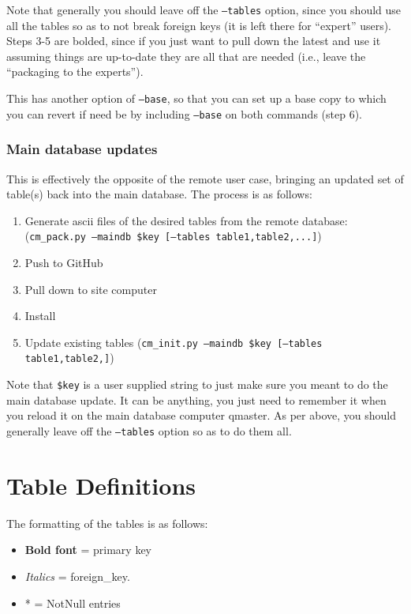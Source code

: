 \documentclass{article}
\begin{document}
Note that generally you should leave off the {\tt --tables} option, since you should use all the tables so as to not break foreign keys (it is left there for ``expert'' users).  Steps 3-5 are bolded, since if you just want to pull down the latest and use it assuming things are up-to-date they are all that are needed (i.e., leave the ``packaging to the experts'').

This has another option of {\tt --base}, so that you can set up a base copy to which you can revert if need be by including {\tt --base} on both commands (step 6).
	
\subsubsection{Main database updates}
This is effectively the opposite of the remote user case, bringing an updated set of table(s) back into the main database.  The process is as follows:
\begin{enumerate}\setlength\itemsep{-.3em}
	\item  Generate ascii files of the desired tables from the remote database: 
		({\tt cm\_pack.py --maindb \$key [--tables table1,table2,...]})
	\item Push to GitHub
	\item Pull down to site computer
	\item Install
	\item Update existing tables  ({\tt cm\_init.py --maindb \$key [--tables table1,table2,]})
\end{enumerate}

Note that {\tt \$key} is a user supplied string to just make sure you meant to do the main database update.  It can be anything, you
just need to remember it when you reload it on the main database computer qmaster.
As per above, you should generally leave off the {\tt --tables} option so as to do them all.  



\newpage

\section{Table Definitions}
\label{sec:tables}

\vspace{5mm}
\etocsettocstyle{}{}
\localtableofcontents
\newpage

The formatting of the tables is as follows: 
\begin{itemize}\setlength\itemsep{-.3em}
	\item {\bf Bold font} = primary key
	\item {\em Italics} = foreign\_key.
	\item * = NotNull entries
\end{itemize}
\end{document}
